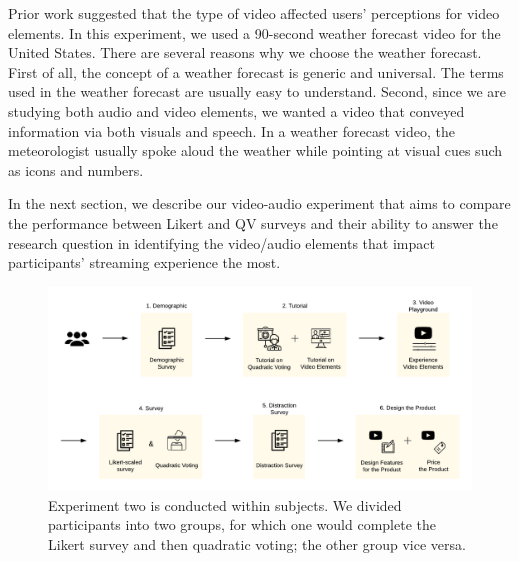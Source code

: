 Prior work suggested that the type of video affected users' perceptions for video elements. In this experiment, we used a 90-second weather forecast video for the United States. There are several reasons why we choose the weather forecast. First of all, the concept of a weather forecast is generic and universal. The terms used in the weather forecast are usually easy to understand. Second, since we are studying both audio and video elements, we wanted a video that conveyed information via both visuals and speech. In a weather forecast video, the meteorologist usually spoke aloud the weather while pointing at visual cues such as icons and numbers.

In the next section, we describe our video-audio experiment that aims to compare the performance between Likert and QV surveys and their ability to answer the research question in identifying the video/audio elements that impact participants' streaming experience the most.

\begin{figure}[htpb]
    \centering
    \includegraphics[width=\textwidth, keepaspectratio=true]{content/image/exp2_procedure.pdf}
    \caption{
        Experiment two is conducted within subjects. We divided participants into two groups, for which one would complete the Likert survey and then quadratic voting; the other group vice versa.
    }
    \label{fig:exp2_flow}
\end{figure}

